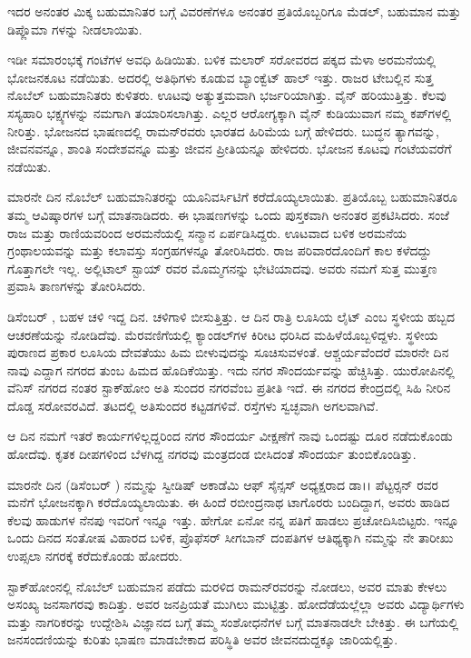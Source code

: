 \vskip 1pt

ಇದರ ಅನಂತರ ಮಿಕ್ಕ ಬಹುಮಾನಿತರ ಬಗ್ಗೆ ವಿವರಣೆಗಳೂ ಅನಂತರ ಪ್ರತಿಯೊಬ್ಬರಿಗೂ ಮೆಡಲ್, ಬಹುಮಾನ ಮತ್ತು ಡಿಪ್ಲೊಮಾ ಗಳನ್ನು ನೀಡಲಾಯಿತು.

\vskip 1pt

ಇಡೀ ಸಮಾರಂಭಕ್ಕೆ  ಗಂಟೆಗಳ ಅವಧಿ ಹಿಡಿಯಿತು. ಬಳಿಕ ಮಲಾರ್ ಸರೋವರದ ಪಕ್ಕದ ಮೆಳಾ ಅರಮನೆಯಲ್ಲಿ ಭೋಜನಕೂಟ ನಡೆಯಿತು. ಅದರಲ್ಲಿ  ಅತಿಥಿಗಳು ಕೂಡುವ ಬ್ಯಾಂಕ್ವೆಟ್ ಹಾಲ್ ಇತ್ತು. ರಾಜರ ಟೇಬಲ್ಲಿನ ಸುತ್ತ ನೊಬೆಲ್ ಬಹುಮಾನಿತರು ಕುಳಿತರು. ಊಟವು ಅತ್ಯುತ್ತಮವಾಗಿ ಭರ್ಜರಿಯಾಗಿತ್ತು. ವೈನ್ ಹರಿಯುತ್ತಿತ್ತು. ಕೆಲವು ಸಸ್ಯಹಾರಿ ಭಕ್ಷ್ಯಗಳನ್ನು ನಮಗಾಗಿ ತಯಾರಿಸಲಾಗಿತ್ತು. ಎಲ್ಲರ ಆರೋಗ್ಯಕ್ಕಾಗಿ ವೈನ್ ಕುಡಿಯುವಾಗ ನಮ್ಮ ಕಪ್‍ಗಳಲ್ಲಿ ನೀರಿತ್ತು. ಭೋಜನದ ಭಾಷಣದಲ್ಲಿ ರಾಮನ್‍ರವರು ಭಾರತದ ಹಿರಿಮೆಯ ಬಗ್ಗೆ ಹೇಳಿದರು. ಬುದ್ಧನ ತ್ಯಾಗವನ್ನು, ಜೀವನವನ್ನೂ, ಶಾಂತಿ ಸಂದೇಶವನ್ನೂ ಮತ್ತು ಜೀವನ ಪ್ರೀತಿಯನ್ನೂ ಹೇಳಿದರು. ಭೋಜನ ಕೂಟವು  ಗಂಟೆಯವರೆಗೆ ನಡೆಯಿತು.

ಮಾರನೇ ದಿನ ನೊಬೆಲ್ ಬಹುಮಾನಿತರನ್ನು ಯೂನಿವರ್ಸಿಟಿಗೆ ಕರೆದೊಯ್ಯಲಾಯಿತು. ಪ್ರತಿಯೊಬ್ಬ ಬಹುಮಾನಿತರೂ ತಮ್ಮ ಆವಿಷ್ಕಾರಗಳ ಬಗ್ಗೆ ಮಾತನಾಡಿದರು. ಈ ಭಾಷಣಗಳನ್ನು ಒಂದು ಪುಸ್ತಕವಾಗಿ ಅನಂತರ ಪ್ರಕಟಿಸಿದರು. ಸಂಜೆ ರಾಜ ಮತ್ತು ರಾಣಿಯವರಿಂದ ಅರಮನೆಯಲ್ಲಿ ಸನ್ಮಾನ ಏರ್ಪಡಿಸಿದ್ದರು. ಊಟವಾದ ಬಳಿಕ ಅರಮನೆಯ ಗ್ರಂಥಾಲಯವನ್ನು ಮತ್ತು ಕಲಾವಸ್ತು ಸಂಗ್ರಹಗಳನ್ನೂ ತೋರಿಸಿದರು. ರಾಜ ಪರಿವಾರದೊಂದಿಗೆ ಕಾಲ ಕಳೆದದ್ದು ಗೊತ್ತಾಗಲೇ ಇಲ್ಲ. ಅಲ್ಲಿ\break ಟಾಲ್ ಸ್ಟಾಯ್ ರವರ ಮೊಮ್ಮಗನನ್ನು ಭೇಟಿಯಾದವು. ಅವರು ನಮಗೆ ಸುತ್ತ ಮುತ್ತಣ ಪ್ರವಾಸಿ ತಾಣಗಳನ್ನು ತೋರಿಸಿದರು.

ಡಿಸೆಂಬರ್ , ಬಹಳ ಚಳಿ ಇದ್ದ ದಿನ. ಚಳಿಗಾಳಿ ಬೀಸುತ್ತಿತ್ತು. ಆ ದಿನ ರಾತ್ರಿ ಲೂಸಿಯ ಲೈಟ್ ಎಂಬ ಸ್ಥಳೀಯ ಹಬ್ಬದ ಆಚರಣೆಯನ್ನು ನೋಡಿದೆವು. ಮೆರವಣಿಗೆಯಲ್ಲಿ ಕ್ಯಾಂಡಲ್‍ಗಳ ಕಿರೀಟ ಧರಿಸಿದ ಮಹಿಳೆಯೊಬ್ಬಳಿದ್ದಳು. ಸ್ಥಳೀಯ ಪುರಾಣದ ಪ್ರಕಾರ ಲೂಸಿಯ ದೇವತೆಯು ಹಿಮ ಬೀಳುವುದನ್ನು ಸೂಚಿಸುವಳಂತೆ. ಆಶ್ಚರ್ಯವೆಂದರೆ ಮಾರನೇ ದಿನ ನಾವು ಎದ್ದಾಗ ನಗರದ ತುಂಬ ಹಿಮದ ಹೊದಿಕೆಯಿತ್ತು. ಇದು ನಗರ ಸೌಂದರ್ಯವನ್ನು ಹೆಚ್ಚಿಸಿತ್ತು. ಯುರೋಪಿನಲ್ಲಿ ವೆನಿಸ್ ನಗರದ ನಂತರ ಸ್ಟಾಕ್‍ಹೋಂ ಅತಿ ಸುಂದರ ನಗರವೆಂಬ ಪ್ರತೀತಿ ಇದೆ. ಈ ನಗರದ ಕೇಂದ್ರದಲ್ಲಿ ಸಿಹಿ ನೀರಿನ ದೊಡ್ಡ ಸರೋವರವಿದೆ. ತಟದಲ್ಲಿ ಅತಿಸುಂದರ ಕಟ್ಟಡಗಳಿವೆ. ರಸ್ತೆಗಳು ಸ್ವಚ್ಛವಾಗಿ ಅಗಲವಾಗಿವೆ.

ಆ ದಿನ ನಮಗೆ ಇತರೆ ಕಾರ್ಯಗಳಿಲ್ಲದ್ದರಿಂದ ನಗರ ಸೌಂದರ್ಯ ವೀಕ್ಷಣೆಗೆ ನಾವು ಒಂದಷ್ಟು ದೂರ ನಡೆದುಕೊಂಡು ಹೋದೆವು. ಕೃತಕ ದೀಪಗಳಿಂದ ಬೆಳಗಿದ್ದ ನಗರವು ಮಂತ್ರದಂಡ ಬೀಸಿದಂತೆ ಸೌಂದರ್ಯ ತುಂಬಿಕೊಂಡಿತ್ತು.

ಮಾರನೇ ದಿನ (ಡಿಸೆಂಬರ್ ) ನಮ್ಮನ್ನು ಸ್ವೀಡಿಷ್ ಅಕಾಡೆಮಿ ಆಫ್ ಸೈನ್ಸಸ್ ಅಧ್ಯಕ್ಷರಾದ ಡಾ।। ಪೆಟ್ಟರ್‍ಸನ್ ರವರ ಮನೆಗೆ ಭೋಜನಕ್ಕಾಗಿ ಕರೆದೊಯ್ಯಲಾಯಿತು. ಈ ಹಿಂದೆ ರಬೀಂದ್ರನಾಥ ಟಾಗೊರರು ಬಂದಿದ್ದಾಗ, ಅವರು ಹಾಡಿದ ಕೆಲವು ಹಾಡುಗಳ ನೆನಪು ಇವರಿಗೆ ಇನ್ನೂ ಇತ್ತು. ಹೇಗೋ ಏನೋ ನನ್ನ ಪತಿಗೆ ಹಾಡಲು ಪ್ರಚೋದಿಸಿಬಿಟ್ಟರು. ಇನ್ನೂ ಒಂದು ದಿನದ ಸಂತೋಷ ವಿಹಾರದ ಬಳಿಕ, ಪ್ರೊಫೆಸರ್ ಸೀಗಬಾನ್ ದಂಪತಿಗಳ ಆತಿಥ್ಯಕ್ಕಾಗಿ ನಮ್ಮನ್ನು ನೇ ತಾರೀಖು ಉಪ್ಸಲಾ ನಗರಕ್ಕೆ ಕರೆದುಕೊಂಡು ಹೋದರು.

ಸ್ಟಾಕ್‍ಹೋಂನಲ್ಲಿ ನೊಬೆಲ್ ಬಹುಮಾನ ಪಡೆದು ಮರಳಿದ ರಾಮನ್‍ರವರನ್ನು ನೋಡಲು, ಅವರ ಮಾತು ಕೇಳಲು ಅಸಂಖ್ಯ ಜನಸಾಗರವು ಕಾದಿತ್ತು. ಅವರ ಜನಪ್ರಿಯತೆ ಮುಗಿಲು ಮುಟ್ಟಿತ್ತು. ಹೋದೆಡೆಯಲ್ಲೆಲ್ಲಾ ಅವರು ವಿದ್ಯಾರ್ಥಿಗಳು ಮತ್ತು ನಾಗರಿಕರನ್ನು ಉದ್ದೇಶಿಸಿ ವಿಜ್ಞಾನದ ಬಗ್ಗೆ ತಮ್ಮ ಸಂಶೋಧನೆಗಳ ಬಗ್ಗೆ ಮಾತನಾಡಲೇ ಬೇಕಿತ್ತು. ಈ ಬಗೆಯಲ್ಲಿ ಜನಸಂದಣಿಯನ್ನು ಕುರಿತು ಭಾಷಣ ಮಾಡಬೇಕಾದ ಪರಿಸ್ಥಿತಿ ಅವರ ಜೀವನದುದ್ದಕ್ಕೂ ಜಾರಿಯಲ್ಲಿತ್ತು.

